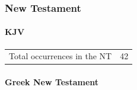 		
	\subsubsection{New Testament} %
		\label{SEAL-NT}
	
		\paragraph{KJV}
			\label{SEAL-NT-KJV}		
	
			\begin{tabular}{ll}
				Total occurrences in the NT & 42
			\end{tabular}
			
			\begin{compactdesc}
				\item[{\hyperref[EPHESIANS-1-13]{Ephesians 1:13}}]
			\end{compactdesc}
			
		\paragraph{Greek New Testament} %
			\label{SEAL-GREEK}
		
			\subparagraph{\texorpdfstring{}{}}
				\label{SPHRAGIZO}
			
